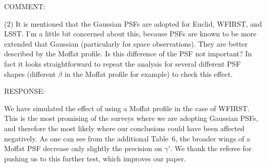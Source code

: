 \documentclass[a4paper,11pt]{article}
\begin{document}
COMMENT:

(2) It is mentioned that the Gaussian PSFs are adopted for Euclid,
WFIRST, and LSST. I'm a little bit concerned about this, because PSFs
are known to be more extended that Gaussian (particularly for space
observations). They are better described by the Moffat profile. Is
this difference of the PSF not important? In fact it looks
straightforward to repeat the analysis for several different PSF
shapes (different $\beta$ in the Moffat profile for example) to check
this effect.

RESPONSE:

We have simulated the effect of using a Moffat profile in the case of
WFIRST. This is the most promising of the surveys where we are
adopting Gaussian PSFs, and therefore the most likely where our
conclusions could have been affected negatively. As one can see from
the additional Table~6, the broader wings of a Moffat PSF decrease
only slightly the precision on $\gamma'$. We thank the referee for
pushing us to this further test, which improves our paper.
\end{document}
